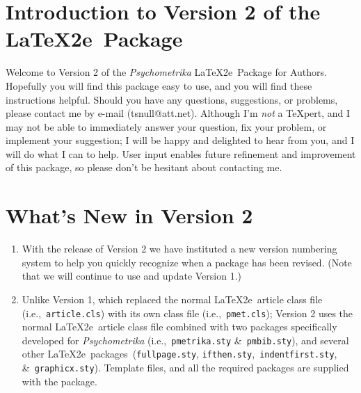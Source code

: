 \documentclass[titlepage,12pt]{article}
\begin{document}
\abstracthead

\begin{abstract}
Guidance on installing and using Version 2 of the
\textit{Psychometrika} \LaTeX2e\ Package for Authors.
\begin{keywords}
software installation, ``howto'' file, \LaTeX2e, templates,
\textit{Psychometrika}, IRT models, LISREL, Bayes estimates.
\end{keywords}
\end{abstract}\vspace{\fill}\pagebreak


\section{Introduction to Version 2 of the \LaTeX2e\ Package}

Welcome to Version 2 of the \textit{Psychometrika} \LaTeX2e\
Package for Authors. Hopefully you will find this package easy to
use, and you will find these instructions helpful. Should you have
any questions, suggestions, or problems, please contact me by
e-mail (tsnull@att.net). Although I'm \textit{not} a \TeX pert,
and I may not be able to immediately answer your question, fix
your problem, or implement your suggestion; I will be happy and
delighted to hear from you, and I will do what I can to help. User
input enables future refinement and improvement of this package,
so please don't be hesitant about contacting me.

\section{What's New in Version 2}

\begin{enumerate}

\item With the release of Version 2 we have instituted a new version
numbering system to help you quickly recognize when a package has
been revised. (Note that we will continue to use and update Version 1.)

\item Unlike Version 1, which replaced the normal \LaTeX2e\ article class file
(i.e.,~\texttt{article.cls}) with its own class file
(i.e.,~\texttt{pmet.cls}); Version 2 uses the normal \LaTeX2e\
article class file combined with two packages specifically
developed for \textit{Psychometrika} (i.e.,~\texttt{pmetrika.sty}
\&~\texttt{pmbib.sty}), and several other \LaTeX2e\
packages~(\texttt{fullpage.sty},
\texttt{ifthen.sty},~\texttt{indentfirst.sty},
\&~\texttt{graphicx.sty}). Template files, and all the required
packages are supplied with the package.

\end{enumerate}
\end{document}
